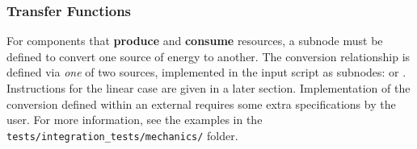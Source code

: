 \subsubsection{Transfer Functions}
For components that \textbf{produce} and \textbf{consume} resources, a  subnode must be defined
to convert one source of energy to another. The conversion relationship is defined via \textit{one} of two sources, implemented
in the input script as subnodes:  or . Instructions for the linear case are given in a later section.
Implementation of the conversion defined within an external  requires some extra specifications by the user. 
For more information, see the examples in the \texttt{tests/integration_tests/mechanics/} folder.






